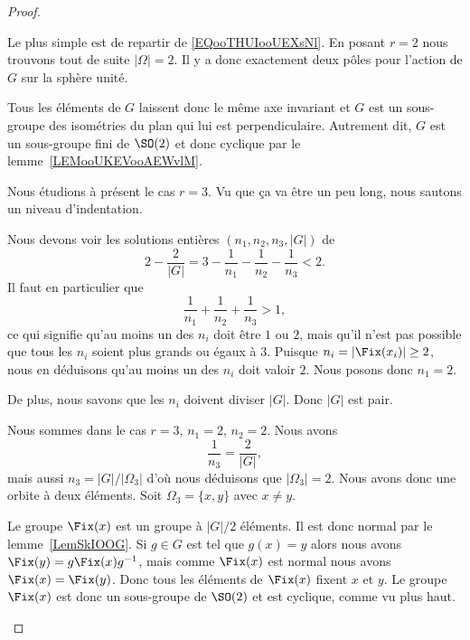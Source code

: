 \begin{proof}
\begin{subproof}
		\spitem[Si \( r=2 \)]
		Le plus simple est de repartir de \eqref{EQooTHUIooUEXsNl}. En posant \( r=2\) nous trouvons tout de suite \( | \Omega |=2\). Il y a donc exactement deux pôles pour l'action de \( G\) sur la sphère unité.

		Tous les éléments de \( G\) laissent donc le même axe invariant et \( G\) est un sous-groupe des isométries du plan qui lui est perpendiculaire. Autrement dit, \( G\) est un sous-groupe fini de \( \SO(2)\) et donc cyclique par le lemme~\ref{LEMooUKEVooAEWvlM}.
    \end{subproof}
    Nous étudions à présent le cas \( r=3\). Vu que ça va être un peu long, nous sautons un niveau d'indentation.
    \begin{subproof}

		\spitem[Les possibilités pour \( r=3 \)]
		Nous devons voir les solutions entières \( (n_1,n_2,n_3,| G |)\) de
		\begin{equation}
			2-\frac{ 2 }{ | G | }=3-\frac{1}{ n_1 }-\frac{1}{ n_2 }-\frac{1}{ n_3 }<2.
		\end{equation}
		Il faut en particulier que
		\begin{equation}
			\frac{1}{ n_1 }+\frac{1}{ n_2 }+\frac{1}{ n_3 }>1,
		\end{equation}
		ce qui signifie qu'au moins un des \( n_i\) doit être \( 1\) ou \( 2\), mais qu'il n'est pas possible que tous les \( n_i\) soient plus grands ou égaux à \( 3\). Puisque \( n_i=| \Fix(x_i) |\geq 2\), nous en déduisons qu'au moins un des \( n_i\) doit valoir \( 2\). Nous posons donc \( n_1=2\).

		De plus, nous savons que les \( n_i\) doivent diviser \( | G |\). Donc \( | G |\) est pair.

		\spitem[Si \( n_2=2 \)]
		Nous sommes dans le cas \( r=3\), \( n_1=2\), \( n_2=2\). Nous avons
		\begin{equation}
			\frac{1}{ n_3 }=\frac{ 2 }{ | G | },
		\end{equation}
		mais aussi \( n_3=| G |/| \Omega_3 |\) d'où nous déduisons que \( | \Omega_3 |=2\). Nous avons donc une orbite à deux éléments. Soit \( \Omega_3=\{ x,y \}\) avec \( x\neq y\).

		Le groupe \( \Fix(x)\) est un groupe à \( | G |/2\) éléments. Il est donc normal par le lemme~\ref{LemSkIOOG}. Si \( g\in G\) est tel que \( g(x)=y\) alors nous avons \( \Fix(y)=g\Fix(x)g^{-1}\), mais comme \( \Fix(x)\) est normal nous avons \( \Fix(x)=\Fix(y)\). Donc tous les éléments de \( \Fix(x)\) fixent \( x\) et \( y\). Le groupe \( \Fix(x)\) est donc un sous-groupe de \( \SO(2)\) et est cyclique, comme vu plus haut.


\end{subproof}
\end{proof}
